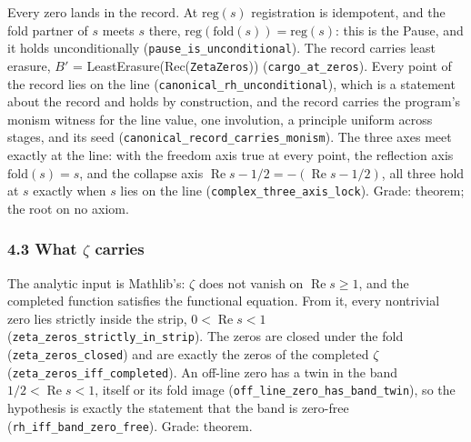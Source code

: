 \documentclass[10pt]{article}
\begin{document}
Every zero lands in the record. At \(\mathrm{reg}(s)\) registration is
idempotent, and the fold partner of \(s\) meets \(s\) there,
\(\mathrm{reg}(\mathrm{fold}(s)) = \mathrm{reg}(s)\): this is the Pause,
and it holds unconditionally
(\texttt{pause\_\allowbreak{}is\_\allowbreak{}unconditional}). The
record carries least erasure, \(B'\) =
LeastErasure(Rec(\texttt{ZetaZeros}))
(\texttt{cargo\_\allowbreak{}at\_\allowbreak{}zeros}). Every point of
the record lies on the line
(\texttt{canonical\_\allowbreak{}rh\_\allowbreak{}unconditional}), which
is a statement about the record and holds by construction, and the
record carries the program's monism witness for the line value, one
involution, a principle uniform across stages, and its seed
(\texttt{canonical\_\allowbreak{}record\_\allowbreak{}carries\_\allowbreak{}monism}).
The three axes meet exactly at the line: with the freedom axis true at
every point, the reflection axis \(\mathrm{fold}(s) = s\), and the
collapse axis
\(\operatorname{Re} s - 1/2 = -(\operatorname{Re} s - 1/2)\), all three
hold at \(s\) exactly when \(s\) lies on the line
(\texttt{complex\_\allowbreak{}three\_\allowbreak{}axis\_\allowbreak{}lock}).
Grade: theorem; the root on no axiom.

\hypertarget{what-zeta-carries}{%
\subsubsection{\texorpdfstring{4.3 What \(\zeta\)
carries}{4.3 What \textbackslash zeta carries}}\label{what-zeta-carries}}

The analytic input is Mathlib's: \(\zeta\) does not vanish on
\(\operatorname{Re} s \ge 1\), and the completed function satisfies the
functional equation. From it, every nontrivial zero lies strictly inside
the strip, \(0 < \operatorname{Re} s < 1\)
(\texttt{zeta\_\allowbreak{}zeros\_\allowbreak{}strictly\_\allowbreak{}in\_\allowbreak{}strip}).
The zeros are closed under the fold
(\texttt{zeta\_\allowbreak{}zeros\_\allowbreak{}closed}) and are exactly
the zeros of the completed \(\zeta\)
(\texttt{zeta\_\allowbreak{}zeros\_\allowbreak{}iff\_\allowbreak{}completed}).
An off-line zero has a twin in the band
\(1/2 < \operatorname{Re} s < 1\), itself or its fold image
(\texttt{off\_\allowbreak{}line\_\allowbreak{}zero\_\allowbreak{}has\_\allowbreak{}band\_\allowbreak{}twin}),
so the hypothesis is exactly the statement that the band is zero-free
(\texttt{rh\_\allowbreak{}iff\_\allowbreak{}band\_\allowbreak{}zero\_\allowbreak{}free}).
Grade: theorem.
\end{document}
